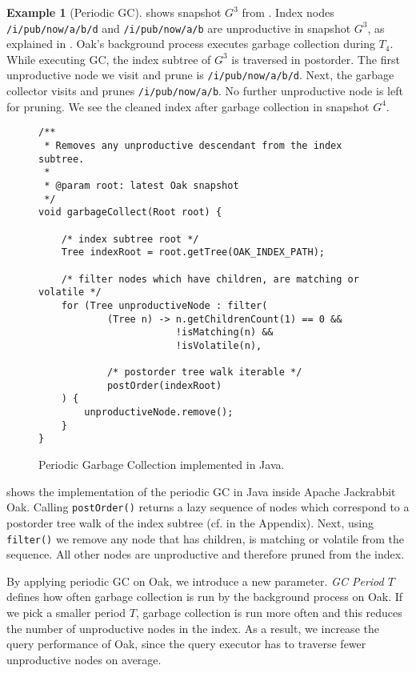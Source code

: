 \documentclass[abstracton,12pt]{scrartcl}
\theoremstyle{definition}
\newtheorem{example}{Example}
\begin{document}
\begin{example}[Periodic GC]
   shows snapshot $G^3$ from
  . Index nodes \texttt{/i/pub/now/a/b/d}
  and \texttt{/i/pub/now/a/b} are unproductive in snapshot $G^3$, as explained
  in . Oak's background process executes garbage
  collection during $T_4$. While executing GC, the index subtree of $G^3$ is
  traversed in postorder.
  The first unproductive node we visit and prune is
  \texttt{/i/pub/now/a/b/d}. Next, the garbage collector visits and prunes
  \texttt{/i/pub/now/a/b}. No further unproductive node is left for pruning. We
  see the cleaned index after garbage collection in snapshot $G^4$.
\end{example}

\begin{figure}[H]
  \small
  \begin{framed}
\begin{verbatim}
/**
 * Removes any unproductive descendant from the index subtree.
 *
 * @param root: latest Oak snapshot 
 */
void garbageCollect(Root root) {

    /* index subtree root */
    Tree indexRoot = root.getTree(OAK_INDEX_PATH);

    /* filter nodes which have children, are matching or volatile */
    for (Tree unproductiveNode : filter(
            (Tree n) -> n.getChildrenCount(1) == 0 &&
                        !isMatching(n) &&
                        !isVolatile(n),

            /* postorder tree walk iterable */
            postOrder(indexRoot)
    ) {
        unproductiveNode.remove();
    }
}
\end{verbatim}
  \end{framed}
  \caption[Periodic GC implemented in Java]{Periodic Garbage Collection
    implemented in Java.}
  \label{fig:java_periodic_gc}
\end{figure}

 shows the implementation of the periodic
GC in Java inside Apache Jackrabbit Oak. Calling \texttt{postOrder()} returns a
lazy sequence of nodes
which correspond to a postorder tree walk of the index subtree (cf.
 in the Appendix). Next, using \texttt{filter()} we
remove any node
that has children, is matching or volatile from the sequence. All other nodes are
unproductive and therefore pruned from the index.

By applying periodic GC on Oak, we introduce a new
parameter. \textit{GC Period $T$} defines how often garbage collection is run by
the background process on Oak. If we pick a smaller
period $T$, garbage collection is run more often and this
reduces the number of unproductive nodes in the index. As a result, we
increase the query performance of Oak,
since the query executor has to traverse fewer unproductive nodes on average.
\end{document}
